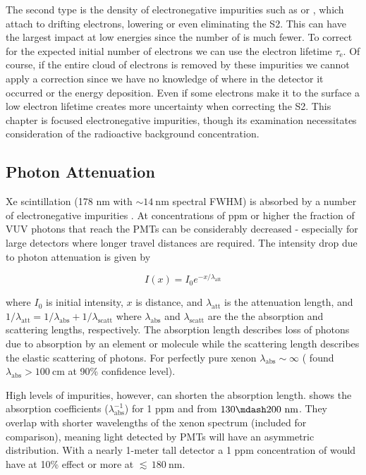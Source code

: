 The second type is the density of electronegative impurities such as  or
, which attach to drifting electrons, lowering or even eliminating the S2.  This can have the largest impact at low energies
since the number of \electron is much fewer.  To correct for the expected initial number of electrons we can use the electron lifetime
$\tau_{\mathrm{e}}$.  Of course, if the entire cloud of electrons is
removed by these impurities we cannot apply a correction since we have no knowledge of where in the detector it occurred or the energy
deposition.  Even if some electrons make it to the surface a low electron lifetime creates more uncertainty when correcting the S2.  This
chapter is focused electronegative impurities, though its examination necessitates consideration of the radioactive background
concentration.

\subsection{Photon Attenuation}
\label{subsec:importance_procedure_effects_photons}
Xe scintillation (178 nm with ${\sim} 14\ \mathrm{nm}$ spectral FWHM) is absorbed by a number of electronegative impurities
.  At concentrations of ppm or higher
the fraction of VUV photons that reach the PMTs can be considerably decreased - especially for large detectors where longer travel
distances are required.  The intensity drop due to photon attenuation is given by

\vspace{-10pt}

\begin{equation}
I(x) = I_0 e^{-x / \lambda_{\mathrm{att}}}
\end{equation}

\noindent where $I_0$ is initial intensity, $x$ is distance, and $\lambda_{\mathrm{att}}$ is the attenuation length, and
$1 / \lambda_{\mathrm{att}} = 1 / \lambda_{\mathrm{abs}} + 1 / \lambda_{\mathrm{scatt}}$ where $\lambda_{\mathrm{abs}}$ and
$\lambda_{\mathrm{scatt}}$ are the the absorption and scattering lengths, respectively.  The absorption length describes loss of
photons due to absorption by an element or molecule while the scattering length describes the elastic scattering of photons.  For
perfectly pure xenon
$\lambda_{\mathrm{abs}} \sim \infty$ ( found $\lambda_{\mathrm{abs}} > 100\ \mathrm{cm}$ at 90\% confidence
level).

High levels of impurities, however, can shorten the absorption
length.   shows the absorption coefficients
($\lambda_{\mathrm{abs}}^{-1}$) for 1 ppm \htwoo and \otwo from $130 \mdash 200\ \mathrm{nm}$.  They overlap with shorter wavelengths
of the xenon spectrum (included for comparison), meaning light detected by PMTs will have an asymmetric distribution.  With a nearly
1-meter tall detector a 1 ppm concentration of \htwoo would have at 10\% effect or more at ${\lesssim}\, 180\ \mathrm{nm}$.

